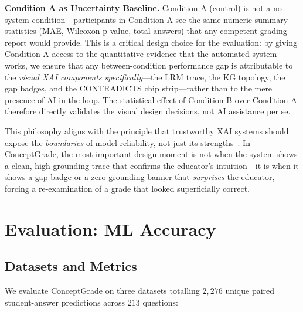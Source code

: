 \documentclass[journal,review]{vgtc}
\begin{document}
\textbf{Condition A as Uncertainty Baseline.} Condition A (control) is not a no-system condition---participants in Condition A see the same numeric summary statistics (MAE, Wilcoxon p-value, total answers) that any competent grading report would provide. This is a critical design choice for the evaluation: by giving Condition A access to the quantitative evidence that the automated system works, we ensure that any between-condition performance gap is attributable to the \textit{visual XAI components specifically}---the LRM trace, the KG topology, the gap badges, and the CONTRADICTS chip strip---rather than to the mere presence of AI in the loop. The statistical effect of Condition B over Condition A therefore directly validates the visual design decisions, not AI assistance per se.

This philosophy aligns with the principle that trustworthy XAI systems should expose the \textit{boundaries} of model reliability, not just its strengths~\cite{Amershi2014}. In ConceptGrade, the most important design moment is not when the system shows a clean, high-grounding trace that confirms the educator's intuition---it is when it shows a gap badge or a zero-grounding banner that \textit{surprises} the educator, forcing a re-examination of a grade that looked superficially correct.


\section{Evaluation: ML Accuracy} \label{sec:evaluation_accuracy}

\subsection{Datasets and Metrics}

We evaluate ConceptGrade on three datasets totalling $2{,}276$ unique
paired student-answer predictions across $213$ questions:
\end{document}
